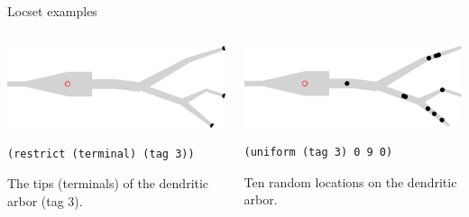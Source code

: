 \documentclass[aspectratio=43]{beamer}
\begin{document}
\begin{frame}[fragile]{Locset examples}
    \begin{columns}[T]
        \begin{column}{0.5\textwidth}
            \includegraphics[width=\textwidth]{images/ls_term.png}

            \vspace{10pt}

            \begin{lstlisting}[style=arblang]
(restrict (terminal) (tag 3))
            \end{lstlisting}

            The tips (terminals) of the dendritic arbor (tag 3).

        \end{column}
        \begin{column}{0.5\textwidth}
            \includegraphics[width=\textwidth]{images/ls_uniform.png}

            \vspace{10pt}

            \begin{lstlisting}[style=arblang]
(uniform (tag 3) 0 9 0)
            \end{lstlisting}

            Ten random locations on the dendritic arbor.

        \end{column}
    \end{columns}
\end{frame}
\end{document}
